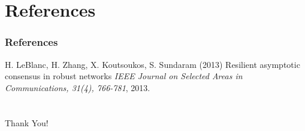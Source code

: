\documentclass{beamer}
\begin{document}
\section{References}
\begin{frame}
\frametitle{References}
\footnotesize{
\begin{thebibliography}{99} %

 H. LeBlanc, H. Zhang, X. Koutsoukos, S. Sundaram (2013)
\newblock Resilient asymptotic consensus in robust networks
\newblock \emph{IEEE Journal on Selected Areas in Communications, 31(4), 766-781}, 2013.

\end{thebibliography}
}
\end{frame}

\section{}
\begin{frame}
\begin{center}
\Huge {Thank You!}
\end{center}
\end{frame}

\end{document}
